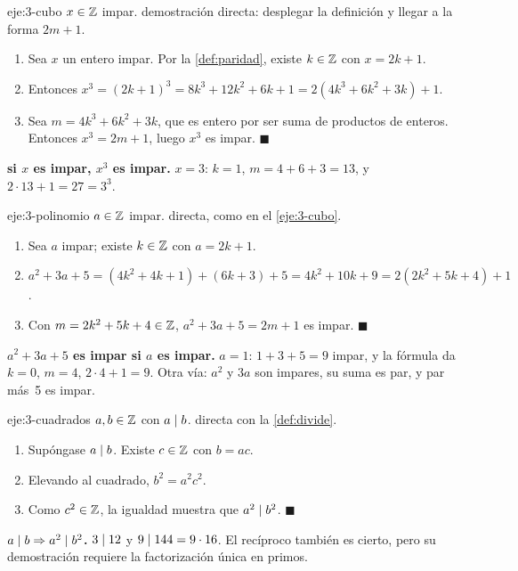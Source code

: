 \begin{solucion}{eje:3-cubo}
\datos $x\in\mathbb{Z}$ impar.
\planteamiento demostración directa: desplegar la definición y llegar a la forma $2m+1$.
\pasos
\begin{enumerate}[label=\arabic*.]
  \item Sea $x$ un entero impar. Por la \cref{def:paridad}, existe $k\in\mathbb{Z}$ con $x=2k+1$.
  \item Entonces $x^{3}=(2k+1)^{3}=8k^{3}+12k^{2}+6k+1=2(4k^{3}+6k^{2}+3k)+1$.
  \item Sea $m=4k^{3}+6k^{2}+3k$, que es entero por ser suma de productos de enteros. Entonces $x^{3}=2m+1$, luego $x^{3}$ es impar. $\blacksquare$
\end{enumerate}
\resultado \textbf{si $x$ es impar, $x^{3}$ es impar.}
\comprobacion $x=3$: $k=1$, $m=4+6+3=13$, y $2\cdot 13+1=27=3^{3}$.
\end{solucion}

\begin{solucion}{eje:3-polinomio}
\datos $a\in\mathbb{Z}$ impar.
\planteamiento directa, como en el \cref{eje:3-cubo}.
\pasos
\begin{enumerate}[label=\arabic*.]
  \item Sea $a$ impar; existe $k\in\mathbb{Z}$ con $a=2k+1$.
  \item $a^{2}+3a+5=(4k^{2}+4k+1)+(6k+3)+5=4k^{2}+10k+9=2(2k^{2}+5k+4)+1$.
  \item Con $m=2k^{2}+5k+4\in\mathbb{Z}$, $a^{2}+3a+5=2m+1$ es impar. $\blacksquare$
\end{enumerate}
\resultado \textbf{$a^{2}+3a+5$ es impar si $a$ es impar.}
\comprobacion $a=1$: $1+3+5=9$ impar, y la fórmula da $k=0$, $m=4$, $2\cdot 4+1=9$. Otra vía: $a^{2}$ y $3a$ son impares, su suma es par, y par más~5 es impar.
\end{solucion}

\begin{solucion}{eje:3-cuadrados}
\datos $a,b\in\mathbb{Z}$ con $a\mid b$.
\planteamiento directa con la \cref{def:divide}.
\pasos
\begin{enumerate}[label=\arabic*.]
  \item Supóngase $a\mid b$. Existe $c\in\mathbb{Z}$ con $b=ac$.
  \item Elevando al cuadrado, $b^{2}=a^{2}c^{2}$.
  \item Como $c^{2}\in\mathbb{Z}$, la igualdad muestra que $a^{2}\mid b^{2}$. $\blacksquare$
\end{enumerate}
\resultado \textbf{$a\mid b\Rightarrow a^{2}\mid b^{2}$.}
\comprobacion $3\mid 12$ y $9\mid 144=9\cdot 16$. El recíproco también es cierto, pero su demostración requiere la factorización única en primos.
\end{solucion}

